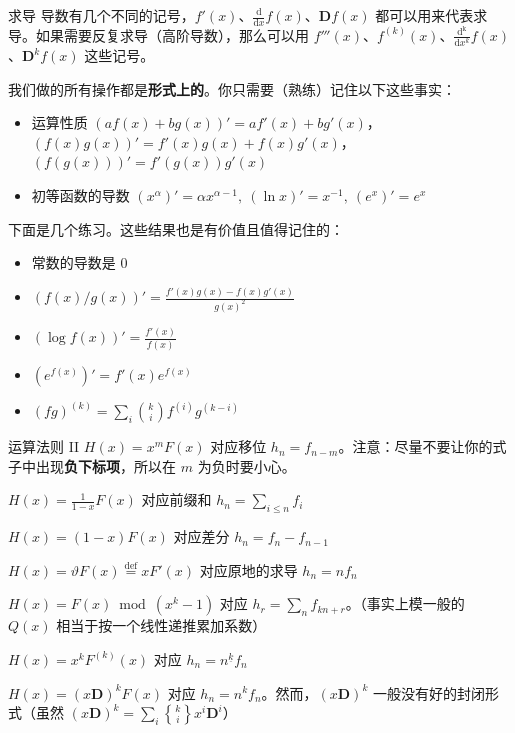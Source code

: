 \begin{frame}{求导}
    导数有几个不同的记号，$f'(x)$、$\frac{\mathrm{d}}{\mathrm{d}x} f(x)$、$\mathbf D f(x)$ 都可以用来代表求导。如果需要反复求导（高阶导数），那么可以用 $f'''(x)$、$f^{(k)}(x)$、$\frac{\mathrm{d^k}}{\mathrm{d}x^k} f(x)$、$\mathbf D^k f(x)$ 这些记号。

    我们做的所有操作都是\textbf{形式上的}。你只需要（熟练）记住以下这些事实：
    \begin{itemize}
        \item 运算性质 $(af(x)+bg(x))'=af'(x)+bg'(x)$，$(f(x)g(x))'=f'(x)g(x)+f(x)g'(x)$，$(f(g(x)))'=f'(g(x))g'(x)$
        \item 初等函数的导数 $(x^{\alpha})'=\alpha x^{\alpha-1},\ (\ln x)'=x^{-1},\ (e^x)'=e^x$
    \end{itemize}
    下面是几个练习。这些结果也是有价值且值得记住的：
    \begin{itemize}
        \item 常数的导数是 $0$
        \item $(f(x)/g(x))'=\frac{f'(x)g(x)-f(x)g'(x)}{g(x)^2}$
        \item $(\log f(x))'=\frac{f'(x)}{f(x)}$
        \item $(e^{f(x)})'=f'(x)e^{f(x)}$
        \item $(fg)^{(k)}=\sum_i \binom{k}{i}f^{(i)}g^{(k-i)}$
    \end{itemize}
\end{frame}
\begin{frame}{运算法则 II}
    $H(x)=x^mF(x)$ 对应移位 $h_n=f_{n-m}$。注意：尽量不要让你的式子中出现\textbf{负下标项}，所以在 $m$ 为负时要小心。

    $H(x)=\frac{1}{1-x}F(x)$ 对应前缀和 $h_n=\sum_{i\le n}f_i$

    $H(x)=(1-x)F(x)$ 对应差分 $h_n=f_n-f_{n-1}$

    $H(x)=\vartheta F(x)\overset{\mathrm{def}}{=}xF'(x)$ 对应原地的求导 $h_n=nf_n$

    $H(x)=F(x)\bmod (x^k-1)$ 对应 $h_r=\sum_n f_{kn+r}$。（事实上模一般的 $Q(x)$ 相当于按一个线性递推累加系数）

    $H(x)=x^kF^{(k)}(x)$ 对应 $h_n=n^{\underline{k}}f_n$

    $H(x)=(x\mathbf D)^kF(x)$ 对应 $h_n=n^k f_n$。然而，$(x\mathbf D)^k$ 一般没有好的封闭形式（虽然 $(x\mathbf D)^k=\sum_i {k\brace i}x^i\mathbf D^i$）
\end{frame}
